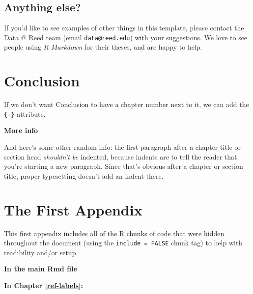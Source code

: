 \documentclass[12pt,twoside]{reedthesis}
\theoremstyle{definition}
\theoremstyle{definition}
\theoremstyle{remark}
\begin{document}
  \section{Anything else?}\label{anything-else}
  
  If you'd like to see examples of other things in this template, please
  contact the Data @ Reed team (email
  \href{mailto:data@reed.edu}{\nolinkurl{data@reed.edu}}) with your
  suggestions. We love to see people using \emph{R Markdown} for their
  theses, and are happy to help.
  
  \chapter*{Conclusion}\label{conclusion}
  
  If we don't want Conclusion to have a chapter number next to it, we can
  add the \texttt{\{-\}} attribute.
  
  \textbf{More info}
  
  And here's some other random info: the first paragraph after a chapter
  title or section head \emph{shouldn't be} indented, because indents are
  to tell the reader that you're starting a new paragraph. Since that's
  obvious after a chapter or section title, proper typesetting doesn't add
  an indent there.
  
  \appendix
  
  \chapter{The First Appendix}\label{the-first-appendix}
  
  This first appendix includes all of the R chunks of code that were
  hidden throughout the document (using the \texttt{include\ =\ FALSE}
  chunk tag) to help with readibility and/or setup.
  
  \textbf{In the main Rmd file}
  
  \textbf{In Chapter \ref{ref-labels}:}
  
\end{document}

